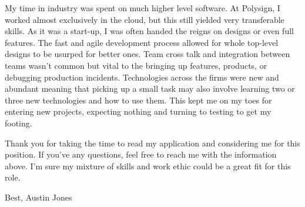 \documentclass[a4paper,12pt]{article}
\begin{document}
My time in industry was spent on much higher level software.
At Polysign, I worked almost exclusively in the cloud, but this still yielded very transferable skills.
As it was a start-up, I was often handed the reigns on designs or even full features.
The fast and agile development process allowed for whole top-level designs to be usurped for better ones.
Team cross talk and integration between teams wasn't common but vital to the bringing up features, products, or debugging production incidents.
Technologies across the firms were new and abundant meaning that picking up a small task may also involve learning two or three new technologies and how to use them.
This kept me on my toes for entering new projects, expecting nothing and turning to testing to get my footing.

Thank you for taking the time to read my application and considering me for this position.
If you've any questions, feel free to reach me with the information above.
I'm sure my mixture of skills and work ethic could be a great fit for this role.

Best,
Austin Jones
\end{document}
